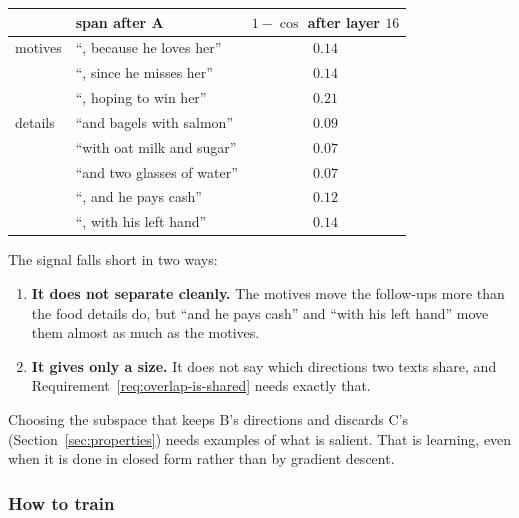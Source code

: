 \documentclass[11pt]{article}
\theoremstyle{remark}
\begin{document}
\begin{center}
\begin{tabular}{llc}
\hline
 & span after A & $1 - \cos$ after layer $16$ \\
\hline
motives & ``, because he loves her'' & $0.14$ \\
 & ``, since he misses her'' & $0.14$ \\
 & ``, hoping to win her'' & $0.21$ \\
\hline
details & ``and bagels with salmon'' & $0.09$ \\
 & ``with oat milk and sugar'' & $0.07$ \\
 & ``and two glasses of water'' & $0.07$ \\
 & ``, and he pays cash'' & $0.12$ \\
 & ``, with his left hand'' & $0.14$ \\
\hline
\end{tabular}
\end{center}

The signal falls short in two ways:
\begin{enumerate}
  \item \textbf{It does not separate cleanly.} The motives move the follow-ups more than the food details do, but ``and he pays cash'' and ``with his left hand'' move them almost as much as the motives.
  \item \textbf{It gives only a size.} It does not say which directions two texts share, and Requirement~\ref{req:overlap-is-shared} needs exactly that.
\end{enumerate}
Choosing the subspace that keeps B's directions and discards C's (Section~\ref{sec:properties}) needs examples of what is salient. That is learning, even when it is done in closed form rather than by gradient descent.

\subsubsection{How to train}
\end{document}
